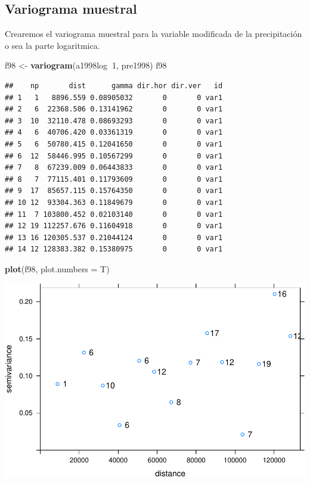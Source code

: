 \documentclass[11pt,]{article}
\newenvironment{Shaded}{\begin{snugshade}}{\end{snugshade}}
\newcommand{\KeywordTok}[1]{\textcolor[rgb]{0.13,0.29,0.53}{\textbf{#1}}}
\newcommand{\DataTypeTok}[1]{\textcolor[rgb]{0.13,0.29,0.53}{#1}}
\newcommand{\DecValTok}[1]{\textcolor[rgb]{0.00,0.00,0.81}{#1}}
\newcommand{\StringTok}[1]{\textcolor[rgb]{0.31,0.60,0.02}{#1}}
\newcommand{\OperatorTok}[1]{\textcolor[rgb]{0.81,0.36,0.00}{\textbf{#1}}}
\newcommand{\NormalTok}[1]{#1}
\begin{document}
\subsection{Variograma muestral}\label{variograma-muestral}

Crearemos el variograma muestral para la variable modificada de la
precipitación o sea la parte logaritmica.

\begin{Shaded}
\begin{Highlighting}[]
\NormalTok{f98 <-}\StringTok{ }\KeywordTok{variogram}\NormalTok{(a1998log}\OperatorTok{~}\DecValTok{1}\NormalTok{, pre1998)}
\NormalTok{f98}
\end{Highlighting}
\end{Shaded}

\begin{verbatim}
##    np       dist      gamma dir.hor dir.ver   id
## 1   1   8896.559 0.08905032       0       0 var1
## 2   6  22368.506 0.13141962       0       0 var1
## 3  10  32110.478 0.08693293       0       0 var1
## 4   6  40706.420 0.03361319       0       0 var1
## 5   6  50780.415 0.12041650       0       0 var1
## 6  12  58446.995 0.10567299       0       0 var1
## 7   8  67239.009 0.06443833       0       0 var1
## 8   7  77115.401 0.11793609       0       0 var1
## 9  17  85657.115 0.15764350       0       0 var1
## 10 12  93304.363 0.11849679       0       0 var1
## 11  7 103800.452 0.02103140       0       0 var1
## 12 19 112257.676 0.11604918       0       0 var1
## 13 16 120305.537 0.21044124       0       0 var1
## 14 12 128383.382 0.15380975       0       0 var1
\end{verbatim}

\begin{Shaded}
\begin{Highlighting}[]
\KeywordTok{plot}\NormalTok{(f98, }\DataTypeTok{plot.numbers =}\NormalTok{ T)}
\end{Highlighting}
\end{Shaded}

\includegraphics{proyecto_Superficie_Continua_files/figure-latex/unnamed-chunk-7-1.pdf}
\end{document}
